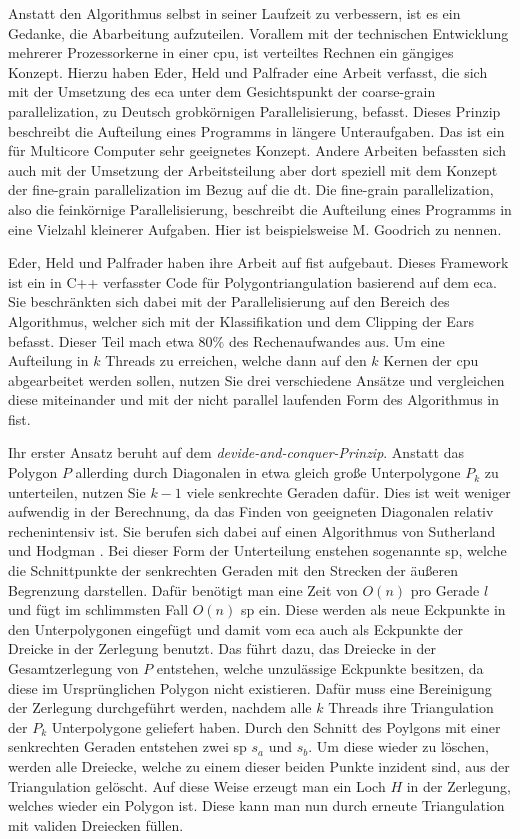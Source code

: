 Anstatt den Algorithmus selbst in seiner Laufzeit zu verbessern, ist es ein Gedanke, die Abarbeitung aufzuteilen. Vorallem mit der technischen Entwicklung mehrerer Prozessorkerne in einer \ac{cpu},
ist verteiltes Rechnen ein gängiges Konzept. Hierzu haben Eder, Held und Palfrader eine Arbeit verfasst, die sich mit der Umsetzung des \ac{eca} unter dem Gesichtspunkt der coarse-grain parallelization,
zu Deutsch grobkörnigen Parallelisierung, befasst.\cite{paralleleca} Dieses Prinzip beschreibt die Aufteilung eines Programms in längere Unteraufgaben. Das ist ein für Multicore Computer sehr geeignetes Konzept.
Andere Arbeiten befassten sich auch mit der Umsetzung der Arbeitsteilung aber dort speziell mit dem Konzept der fine-grain parallelization im Bezug auf die \ac{dt}. Die fine-grain parallelization, also die feinkörnige 
Parallelisierung, beschreibt die Aufteilung eines Programms in eine Vielzahl kleinerer Aufgaben. 
Hier ist beispielsweise M. Goodrich\cite{goodrich} zu nennen.

Eder, Held und Palfrader haben ihre Arbeit auf \ac{fist} aufgebaut. Dieses Framework ist ein in C++ verfasster Code für Polygontriangulation basierend auf dem \ac{eca}.\cite{paralleleca}
Sie beschränkten sich dabei mit der Parallelisierung auf den Bereich des Algorithmus, welcher sich mit der Klassifikation und dem Clipping der Ears befasst. Dieser Teil mach etwa $80\%$ des Rechenaufwandes aus.
Um eine Aufteilung in $k$ Threads zu erreichen, welche dann auf den $k$ Kernen der \ac{cpu} abgearbeitet werden sollen, nutzen Sie drei verschiedene Ansätze und vergleichen diese miteinander und mit der nicht parallel 
laufenden Form des Algorithmus in \ac{fist}.

Ihr erster Ansatz beruht auf dem \emph{devide-and-conquer-Prinzip}. Anstatt das Polygon $P$ allerding durch Diagonalen in etwa gleich große Unterpolygone $P_k$ zu unterteilen, 
nutzen Sie $k-1$ viele senkrechte Geraden dafür. Dies ist weit weniger aufwendig in der Berechnung, da das Finden von geeigneten Diagonalen relativ rechenintensiv ist.
Sie berufen sich dabei auf einen Algorithmus von Sutherland und Hodgman \cite{dnc}. Bei dieser Form der Unterteilung enstehen sogenannte \ac{sp}, welche die Schnittpunkte der senkrechten Geraden mit 
den Strecken der äußeren Begrenzung darstellen. Dafür benötigt man eine Zeit von $O(n)$ pro Gerade $l$ und fügt im schlimmsten Fall $O(n)$ \ac{sp} ein. Diese werden als neue Eckpunkte in den Unterpolygonen eingefügt und damit vom \ac{eca} auch als Eckpunkte der Dreicke in der Zerlegung benutzt. 
Das führt dazu, das Dreiecke in der Gesamtzerlegung von $P$ entstehen, welche unzulässige Eckpunkte besitzen, da diese im Ursprünglichen Polygon nicht existieren. 
Dafür muss eine Bereinigung der Zerlegung durchgeführt werden, nachdem alle $k$ Threads ihre Triangulation der $P_k$ Unterpolygone geliefert haben. 
Durch den Schnitt des Poylgons mit einer senkrechten Geraden entstehen zwei \ac{sp} $s_a$ und $s_b$. Um diese wieder zu löschen, werden alle Dreiecke, welche zu einem dieser beiden Punkte inzident sind, aus der Triangulation 
gelöscht. Auf diese Weise erzeugt man ein Loch $H$ in der Zerlegung, welches wieder ein Polygon ist. Diese kann man nun durch erneute Triangulation mit validen Dreiecken füllen. \linebreak 

